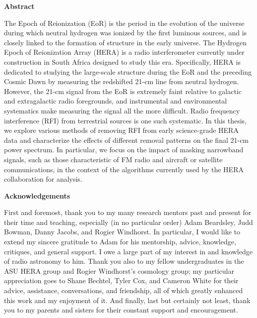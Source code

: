 \documentclass[12pt]{article}
\begin{document}
\clearpage
{}

\begin{center}
	\textbf{Abstract}
\end{center}

The Epoch of Reionization (EoR) is the period in the evolution of the universe during which neutral hydrogen was ionized by the first luminous sources, and is closely linked to the formation of structure in the early universe. The Hydrogen Epoch of Reionization Array (HERA) is a radio interferometer currently under construction in South Africa designed to study this era. Specifically, HERA is dedicated to studying the large-scale structure during the EoR and the preceding Cosmic Dawn by measuring the redshifted 21-cm line from neutral hydrogen. However, the 21-cm signal from the EoR is extremely faint relative to galactic and extragalactic radio foregrounds, and instrumental and environmental systematics make measuring the signal all the more difficult. Radio frequency interference (RFI) from terrestrial sources is one such systematic. In this thesis, we explore various methods of removing RFI from early science-grade HERA data and characterize the effects of different removal patterns on the final 21-cm power spectrum. In particular, we focus on the impact of masking narrowband signals, such as those characteristic of FM radio and aircraft or satellite communications, in the context of the algorithms currently used by the HERA collaboration for analysis. 

\newpage
\begingroup
\hypersetup{
	citecolor=DarkBlue,
	filecolor=black,
	linkcolor=black,
	urlcolor=DarkBlue
}
\renewcommand{\thesection}{\Roman{section}}
\tableofcontents
\listoffigures
\endgroup

\newpage
\begin{center}
	\textbf{Acknowledgements}
\end{center}

First and foremost, thank you to my many research mentors past and present for their time and teaching, especially (in no particular order) Adam Beardsley, Judd Bowman, Danny Jacobs, and Rogier Windhorst. In particular, I would like to extend my sincere gratitude to Adam for his mentorship, advice, knowledge, critiques, and general support. I owe a large part of my interest in and knowledge of radio astronomy to him. Thank you also to my fellow undergraduates in the ASU HERA group and Rogier Windhorst's cosmology group; my particular appreciation goes to Shane Bechtel, Tyler Cox, and Cameron White for their advice, assistance, conversations, and friendship, all of which greatly enhanced this work and my enjoyment of it. And finally, last but certainly not least, thank you to my parents and sisters for their constant support and encouragement.
\end{document}
